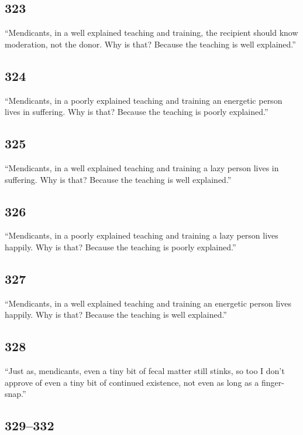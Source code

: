 \documentclass[12pt,openany]{book}%
\begin{document}
\subsection*{323 }

“Mendicants, in a well explained teaching and training, the recipient should know moderation, not the donor. Why is that? Because the teaching is well explained.” 

\subsection*{324 }

“Mendicants, in a poorly explained teaching and training an energetic person lives in suffering. Why is that? Because the teaching is poorly explained.” 

\subsection*{325 }

“Mendicants, in a well explained teaching and training a lazy person lives in suffering. Why is that? Because the teaching is well explained.” 

\subsection*{326 }

“Mendicants, in a poorly explained teaching and training a lazy person lives happily. Why is that? Because the teaching is poorly explained.” 

\subsection*{327 }

“Mendicants, in a well explained teaching and training an energetic person lives happily. Why is that? Because the teaching is well explained.” 

\subsection*{328 }

“Just as, mendicants, even a tiny bit of fecal matter still stinks, so too I don’t approve of even a tiny bit of continued existence, not even as long as a finger-snap.” 

\subsection*{329–332 }
\end{document}
